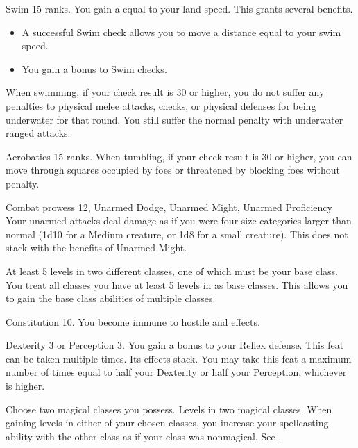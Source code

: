 \featpre Swim 15 ranks.
\featben You gain a  equal to your land speed.
This grants several benefits.
\begin{itemize}
    \item A successful Swim check allows you to move a distance equal to your swim speed.
    \item You gain a  bonus to Swim checks.
\end{itemize}

When swimming, if your check result is 30 or higher, you do not suffer any penalties to physical melee attacks, checks, or physical defenses for being underwater for that round.
You still suffer the normal penalty with underwater ranged attacks.

\featpre Acrobatics 15 ranks.
\featben When tumbling, if your check result is 30 or higher, you can move through squares occupied by foes or threatened by blocking foes without penalty.

\featpres Combat prowess 12, Unarmed Dodge, Unarmed Might, Unarmed Proficiency
\featben Your unarmed attacks deal damage as if you were four size categories larger than normal (1d10 for a Medium creature, or 1d8 for a small creature).
This does not stack with the benefits of Unarmed Might.

\featpres At least 5 levels in two different classes, one of which must be your base class.
\featben You treat all classes you have at least 5 levels in as base classes.
This allows you to gain the base class abilities of multiple classes.

\featpre Constitution 10.
\featben You become immune to hostile  and  effects.

\featpre Dexterity 3 or Perception 3.
\featben You gain a  bonus to your Reflex defense.
 This feat can be taken multiple times. Its effects stack.
You may take this feat a maximum number of times equal to half your Dexterity or half your Perception, whichever is higher.

Choose two magical classes you possess.
\featpres
Levels in two magical classes.
\featben When gaining levels in either of your chosen classes, you increase your spellcasting ability with the other class as if your class was nonmagical.
See .

